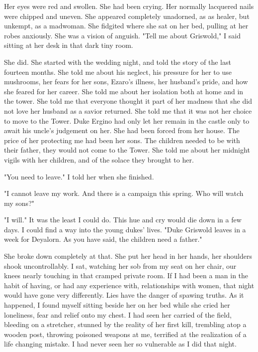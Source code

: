 \documentclass{article}
\begin{document}
Her eyes were red and swollen. She had been crying. Her normally lacquered nails were chipped and uneven. She appeared completely unadorned, as as healer, but unkempt, as a madwoman. She fidgited where she sat on her bed, pulling at her robes anxiously. She was a vision of anguish. "Tell me about Griswold," I said sitting at her desk in that dark tiny room.

She did. She started with the wedding night, and told the story of the last fourteen months. She told me about his neglect, his pressure for her to use mushrooms, her fears for her sons, Ezaro's illness, her husband's pride, and how she feared for her career. She told me about her isolation both at home and in the tower. She told me that everyone thought it part of her madness that she did not love her husband as a savior returned. She told me that it was not her choice to move to the Tower. Duke Ergino had only let her remain in the castle only to await his uncle's judgement on her. She had been forced from her house. The price of her protecting me had been her sons. The children needed to be with their father, they would not come to the Tower. She told me about her midnight vigils with her children, and of the solace they brought to her. 

"You need to leave." I told her when she finished. 

"I cannot leave my work. And there is a campaign this spring. Who will watch my sons?"

"I will." It was the least I could do. This hue and cry would die down in a few days. I could find a way into the young dukes' lives. "Duke Griswold leaves in a week for Deyalorn. As you have said, the children need a father." 

She broke down completely at that. She put her head in her hands, her shoulders shook uncontrollably. I sat, watching her sob from my seat on her chair, our knees nearly touching in that cramped private room. If I had been a man in the habit of having, or had any experience with, relationships with women, that night would have gone very differently. Lies have the danger of spawing truths. As it happened, I found myself sitting beside her on her bed while she cried her loneliness, fear and relief onto my chest. I had seen her carried of the field, bleeding on a stretcher, stunned by the reality of her first kill, trembling atop a wooden post, throwing poisoned weapons at me, terrified at the realization of a life changing mistake. I had never seen her so vulnerable as I did that night.
\end{document}
